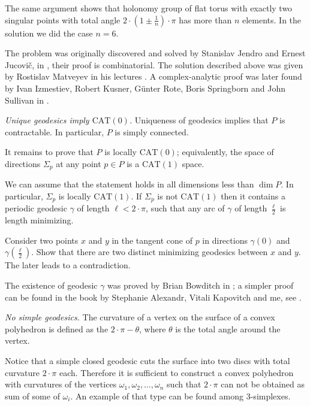 The same argument shows that 
holonomy group of flat torus with exactly two singular points with total angle $2\cdot(1\pm \tfrac1n)\cdot\pi$ has more than $n$ elements.
In the solution we did the case $n=6$.

The problem was originally discovered and solved by Stanislav Jendro{}
and Ernest Jucovi\v{c}, in \cite{jendrol-jucovich},
their proof is combinatorial.
The solution described above was given by Rostislav Matveyev
in his lectures \cite{matveyev}.
A complex-analytic proof was later found by Ivan Izmestiev, Robert Kusner, G{\"u}nter Rote, Boris Springborn and John Sullivan in \cite{izmestiev-rote-springborn-kusner}.

\textit{Unique geodesics imply $\mathrm{CAT}(0)$.}
Uniqueness of geodesics implies that $P$ is contractable.
In particular, $P$ is simply connected.

It remains to prove that $P$ is locally $\mathrm{CAT}(0)$;
equivalently, the space of directions $\Sigma_p$
at any point $p\in P$ is  a $\mathrm{CAT}(1)$ space.

We can assume that the statement holds in all dimensions less than $\dim P$. 
In particular, $\Sigma_p$ is locally $\mathrm{CAT}(1)$.
If $\Sigma_p$ is not $\mathrm{CAT}(1)$ then it contains a periodic geodesic $\gamma$ of length $\ell<2\cdot\pi$,
such that any arc of $\gamma$ of length $\tfrac\ell2$ is length minimizing.

Consider two points $x$ and $y$
in the tangent cone of $p$
in directions $\gamma(0)$ and $\gamma(\tfrac\ell2)$.
Show that there are two distinct minimizing geodesics between $x$ and $y$.
The later leads to a contradiction.

The existence of geodesic $\gamma$ was proved by Brian Bowditch in \cite{bowditch};
a simpler proof can be found in the book 
by Stephanie Alexandr, Vitali Kapovitch and me, see \cite{akp}.



\textit{No simple geodesics.}
The curvature of a vertex on the surface of a convex polyhedron
is defined as the $2\cdot\pi-\theta$, where $\theta$ is the total angle around the vertex.

Notice that a simple closed geodesic cuts the surface into two discs with total curvature $2\cdot\pi$ each.
Therefore it is sufficient to construct a convex polyhedron with curvatures of the vertices $\omega_1,\omega_2,\dots,\omega_n$ such that
$2\cdot\pi$ can not be obtained as sum of some of $\omega_i$.
An example of that type can be found among 3-simplexes.
 
